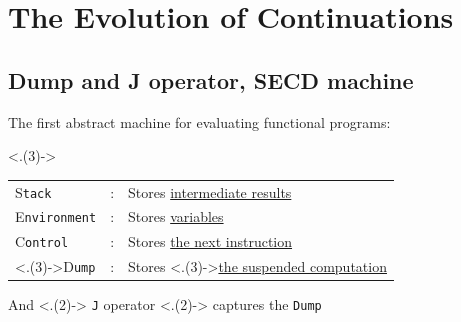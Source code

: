 \section{The Evolution of Continuations}
\TableOfContents{}

\subsection{Dump and J operator, SECD machine}
\begin{frame}[fragile]
	\frametitlesubs

	The first abstract machine for evaluating \textcolor{subhighlight}{functional} programs\cite{landin1964mechanical}:

	\only<.(3)->\small
	\vspace{-.4\zh}
	\begin{table}[h!]
		\begin{tabular}{lcl}

			{\boldslant S}\texttt{tack}                   & : & Stores \underline{intermediate results}                                                \\
			{\boldslant E}\texttt{nvironment}             & : & Stores \underline{variables}                                                           \\
			{\boldslant C}\texttt{ontrol}                 & : & Stores \underline{the next instruction}                                                \\

			\only<.(3)->\large {\boldslant D}\texttt{ump} & : & Stores {\only<.(3)->{\large\bf\color{highlight}}\underline{the suspended computation}} \\
		\end{tabular}
	\end{table}

	\pause
	\vspace{-.4\zh}
	\hspace{1.7\zw}
	And
	\only<.(2)->\large
	\verb|J| operator
		{\only<.(2)->{\bf\color{highlight}}
			captures the \verb|Dump|}\cite{landin1965generalization}

	\pause
	\vspace{-1.4\zh}
	\begin{figure}[h!]
	\end{figure}
\end{frame}

